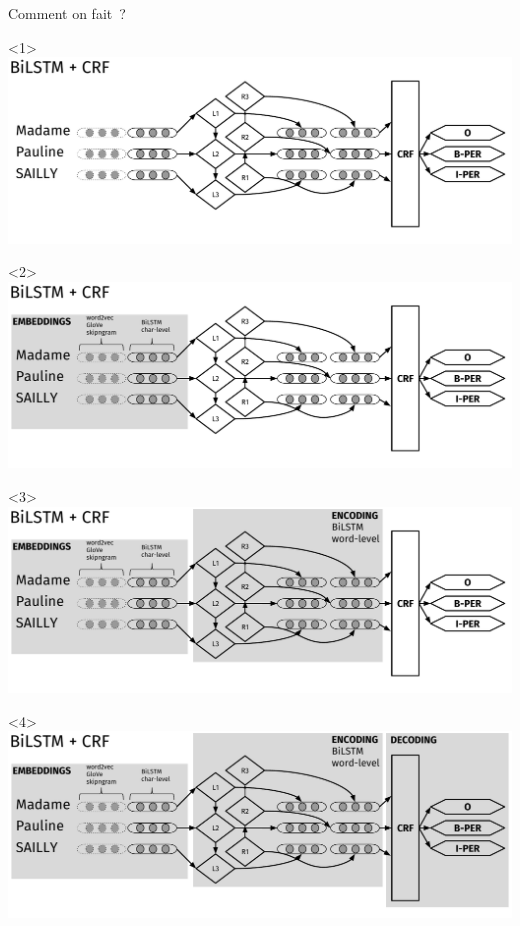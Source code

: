 \documentclass[10pt]{beamer}
\begin{document}
\begin{frame}{Comment on fait~?}
\vspace{2cm}
\begin{onlyenv}<1>\vspace*{\fill}\includegraphics[width=1\linewidth]{"img/bilstm"}\vspace*{\fill}\end{onlyenv}
\begin{onlyenv}<2>\vspace*{\fill}\includegraphics[width=1\linewidth]{"img/bilstm1"}\vspace*{\fill}\end{onlyenv}
\begin{onlyenv}<3>\vspace*{\fill}\includegraphics[width=1\linewidth]{"img/bilstm2"}\vspace*{\fill}\end{onlyenv}
\begin{onlyenv}<4>\vspace*{\fill}\includegraphics[width=1\linewidth]{"img/bilstm3"}\vspace*{\fill}\end{onlyenv}
	


\end{frame}
\end{document}
